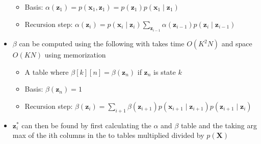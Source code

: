\documentclass[a4, english]{article}
\begin{document}
\begin{itemize}
\begin{itemize}
	  \item Basis:  $\alpha(\pmb z_1) = p(\pmb x_1, \pmb z_1) = p(\pmb z_1)p(\pmb x_1 \mid \pmb z_1)$ 
	  \item Recursion step: $\alpha(\pmb z_i) = p(\pmb x_i \mid \pmb z_i) \sum_{\pmb z_{i-1}} \alpha (\pmb z_{i-1}) p(\pmb z_i \mid \pmb z_{i-1})$
  \end{itemize}
	\item $\beta$ can be computed using the following with takes time $O(K^2N)$ and space $O(KN)$ using memorization
  \begin{itemize}
	  \item A table where $\beta[k][n] = \beta(\pmb z_n)$ if $\pmb z_n$ is state $k$
	  \item Basis: $\beta(\pmb z_n) = 1 $ 
	  \item Recursion step: $\beta(\pmb z_i) = \sum_{i+1} \beta (\pmb z_{i+1} ) p(\pmb x_{i+1} \mid \pmb z_{i+1}) p(\pmb z_{i+1} \mid \pmb z_i)$
  \end{itemize}
  \item $\pmb z_i^*$ can then be found by first calculating the $\alpha$ and $\beta$ table and the taking arg max of the ith columns in the to tables multiplied divided by $p(\pmb X)$ 
\end{itemize}
\end{document}
